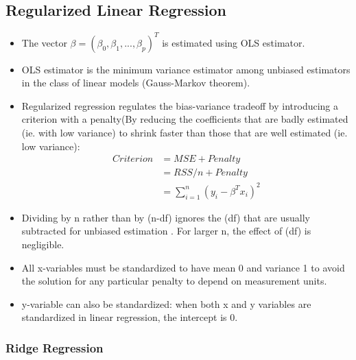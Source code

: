\documentclass[12pt, oneside]{article}
\begin{document}
\subsection{Regularized Linear Regression}
\begin{itemize}
    \item The vector $\beta = (\beta_0, \beta_1,...,\beta_p)^T$ is estimated using OLS estimator.
    \item OLS estimator is the minimum variance estimator among unbiased estimators in the class of linear models (Gauss-Markov theorem). 
    \item Regularized regression regulates the bias-variance tradeoff by introducing a criterion with a penalty(By reducing the coefficients that are badly estimated (ie. with low variance) to shrink faster than those that are well estimated (ie. low variance):
    \begin{align*}
        Criterion &= MSE + Penalty \\
        &= RSS/n + Penalty \\
        &= \sum^n_{i=1}(y_i - \beta^Tx_i)^2
    \end{align*}
    \item Dividing by n rather than by (n-df) ignores the (df) that are usually subtracted for unbiased estimation . For larger n, the effect of (df) is negligible. 
    \item All x-variables must be standardized to have mean 0 and variance 1 to avoid the solution for any particular penalty to depend on measurement units. 
    \item y-variable can also be standardized: when both x and y variables are standardized in linear regression, the intercept is 0. 
\end{itemize}

\subsubsection{Ridge Regression}
\end{document}

